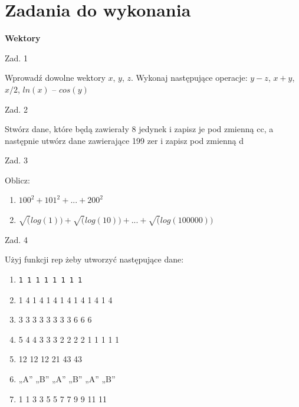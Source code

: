 \documentclass[12pt,B5paper,]{book}
\begin{document}
\vspace{0.8cm}

\section{Zadania do wykonania}\label{zadania-do-wykonania-1}

\textbf{Wektory}

Zad. 1

Wprowadź dowolne wektory \(x\), \(y\), \(z\). Wykonaj następujące
operacje: \(y-z\), \(x+y\), \(x/2\), \(ln(x)\) -- \(cos(y)\)

\vspace{0.8cm}

Zad. 2

Stwórz dane, które będą zawierały 8 jedynek i zapisz je pod zmienną cc,
a następnie utwórz dane zawierające 199 zer i zapisz pod zmienną d

\vspace{0.8cm}

Zad. 3

Oblicz:

\begin{enumerate}
\def\labelenumi{\alph{enumi})}
\item
  \(100^2+101^2+...+200^2\)
\item
  \(\sqrt(log(1))+\sqrt(log(10))+...+\sqrt(log(100000))\)
\end{enumerate}

\vspace{0.8cm}

Zad. 4

Użyj funkcji rep żeby utworzyć następujące dane:

\begin{enumerate}
\def\labelenumi{\alph{enumi})}
\item
\begin{verbatim}
1 1 1 1 1 1 1 1 
\end{verbatim}
\item
  1 4 1 4 1 4 1 4 1 4 1 4 1 4
\item
  3 3 3 3 3 3 3 3 6 6 6
\item
  5 4 4 3 3 3 2 2 2 2 1 1 1 1 1
\item
  12 12 12 21 43 43
\item
  „A'' „B'' „A'' „B'' „A'' „B''
\item
  1 1 3 3 5 5 7 7 9 9 11 11
\end{enumerate}

\vspace{0.8cm}
\end{document}
